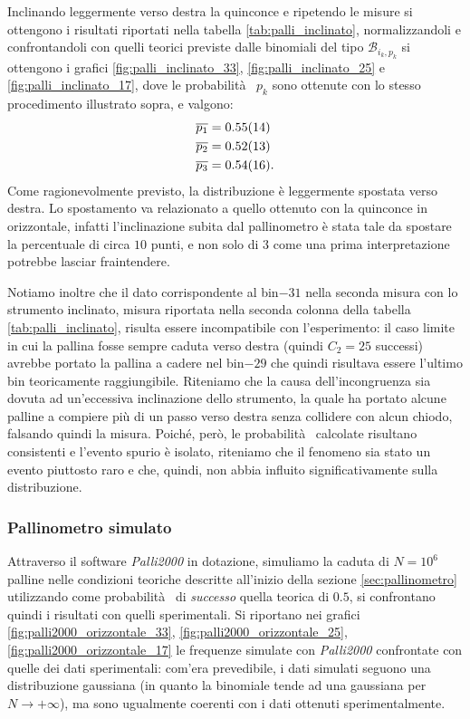 \documentclass[10pt,oneside,a4paper]{article}
\begin{document}
Inclinando leggermente verso destra la quinconce e ripetendo le misure si ottengono i risultati riportati nella tabella \ref{tab:palli_inclinato}, normalizzandoli e confrontandoli con quelli teorici previste dalle binomiali del tipo $\mathscr{B}_{i_k, p_k}$ si ottengono i grafici \ref{fig:palli_inclinato_33}, \ref{fig:palli_inclinato_25} e \ref{fig:palli_inclinato_17}, dove le probabilità  $p_k$ sono ottenute con lo stesso procedimento illustrato sopra, e valgono:
\begin{align*}
	& \overline{p_1} = \SI{0.55 \pm 0.14}{} \\ 
	& \overline{p_2} = \SI{0.52 \pm 0.13}{} \\
	& \overline{p_3} = \SI{0.54 \pm 0.16}{}.
\end{align*}
Come ragionevolmente previsto, la distribuzione è leggermente spostata verso destra. Lo spostamento va relazionato a quello ottenuto con la quinconce in orizzontale, infatti l'inclinazione subita dal pallinometro è stata tale da spostare la percentuale di circa $10$ punti, e non solo di $3$ come una prima interpretazione potrebbe lasciar fraintendere.

Notiamo inoltre che il dato corrispondente al bin$-31$ nella seconda misura con lo strumento inclinato, misura riportata nella seconda colonna della tabella \ref{tab:palli_inclinato}, risulta essere incompatibile con l'esperimento: il caso limite in cui la pallina fosse sempre caduta verso destra (quindi $C_2 = 25$ successi) avrebbe portato la pallina a cadere nel bin$-29$ che quindi risultava essere l'ultimo bin teoricamente raggiungibile. Riteniamo che la causa dell'incongruenza sia dovuta ad un'eccessiva inclinazione dello strumento, la quale ha portato alcune palline a compiere più di un passo verso destra senza collidere con alcun chiodo, falsando quindi la misura. Poiché, però, le probabilità  calcolate risultano consistenti e l'evento spurio è isolato, riteniamo che il fenomeno sia stato un evento piuttosto raro e che, quindi, non abbia influito significativamente  sulla distribuzione. 

\subsubsection{Pallinometro simulato}
Attraverso il software \emph{Palli2000} in dotazione, simuliamo la caduta di $N = 10^6$ palline nelle condizioni teoriche descritte all'inizio della sezione \ref{sec:pallinometro} utilizzando come probabilità  di \emph{successo} quella teorica di $0.5$, si confrontano quindi i risultati con quelli sperimentali. Si riportano nei grafici \ref{fig:palli2000_orizzontale_33}, \ref{fig:palli2000_orizzontale_25}, \ref{fig:palli2000_orizzontale_17} le frequenze simulate con \emph{Palli2000} confrontate con quelle dei dati sperimentali: com'era prevedibile, i dati simulati seguono una distribuzione gaussiana (in quanto la binomiale tende ad una gaussiana per $N \rightarrow + \infty$), ma sono ugualmente coerenti con i dati ottenuti sperimentalmente.
\end{document}
